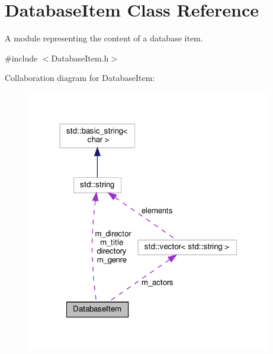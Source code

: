 \hypertarget{classDatabaseItem}{}\section{Database\+Item Class Reference}
\label{classDatabaseItem}


A module representing the content of a database item.  




{\ttfamily \#include $<$Database\+Item.\+h$>$}



Collaboration diagram for Database\+Item\+:\nopagebreak
\begin{figure}[H]
\begin{center}
\leavevmode
\includegraphics[width=304pt]{classDatabaseItem__coll__graph}
\end{center}
\end{figure}
